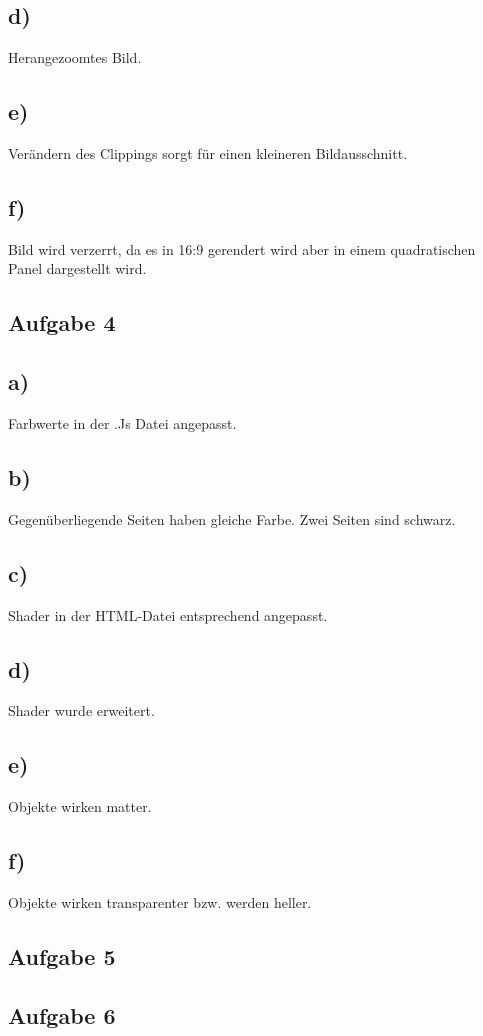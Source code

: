 \documentclass{article}
\begin{document}
	\subsection*{d)}
	Herangezoomtes Bild.
	\subsection*{e)}
	Verändern des Clippings sorgt für einen kleineren Bildausschnitt.
	\subsection*{f)}
	Bild wird verzerrt, da es in 16:9 gerendert wird aber in einem quadratischen Panel dargestellt wird.
	\subsection*{Aufgabe 4}
	\subsection*{a)}
	Farbwerte in der .Js Datei angepasst.
	\subsection*{b)}
	Gegenüberliegende Seiten haben gleiche Farbe. Zwei Seiten sind schwarz.
	\subsection*{c)}
	Shader in der HTML-Datei entsprechend angepasst.
	\subsection*{d)}
	Shader wurde erweitert.
	\subsection*{e)}
	Objekte wirken matter. 
	\subsection*{f)}
	Objekte wirken transparenter bzw. werden heller.
	\subsection*{Aufgabe 5}
	\subsection*{Aufgabe 6}
\end{document}
